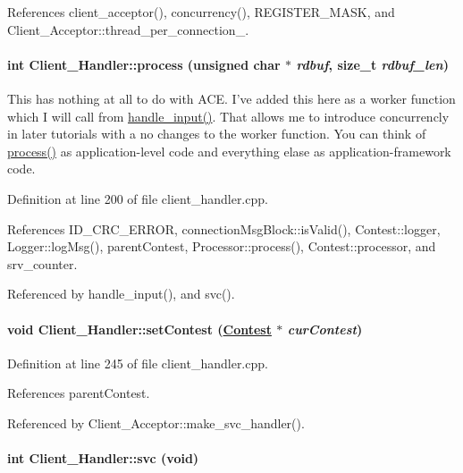 References client\_\-acceptor(), concurrency(), REGISTER\_\-MASK, and Client\_\-Acceptor::thread\_\-per\_\-connection\_\-.\hypertarget{classClient__Handler_Client__Handlerb1}{
\paragraph[process]{\setlength{\rightskip}{0pt plus 5cm}int Client\_\-Handler::process (unsigned char $\ast$ {\em rdbuf}, size\_\-t {\em rdbuf\_\-len})}\hfill}
\label{classClient__Handler_Client__Handlerb1}


This has nothing at all to do with ACE. I've added this here as a worker function which I will call from \hyperlink{classClient__Handler_Client__Handlera5}{handle\_\-input()}. That allows me to introduce concurrencly in later tutorials with a no changes to the worker function. You can think of \hyperlink{classClient__Handler_Client__Handlerb1}{process()} as application-level code and everything elase as application-framework code. 

Definition at line 200 of file client\_\-handler.cpp.

References ID\_\-CRC\_\-ERROR, connection\-Msg\-Block::is\-Valid(), Contest::logger, Logger::log\-Msg(), parent\-Contest, Processor::process(), Contest::processor, and srv\_\-counter.

Referenced by handle\_\-input(), and svc().\hypertarget{classClient__Handler_Client__Handlera6}{
\paragraph[setContest]{\setlength{\rightskip}{0pt plus 5cm}void Client\_\-Handler::set\-Contest (\hyperlink{classContest}{Contest} $\ast$ {\em cur\-Contest})}\hfill}
\label{classClient__Handler_Client__Handlera6}




Definition at line 245 of file client\_\-handler.cpp.

References parent\-Contest.

Referenced by Client\_\-Acceptor::make\_\-svc\_\-handler().\hypertarget{classClient__Handler_Client__Handlerb0}{
\paragraph[svc]{\setlength{\rightskip}{0pt plus 5cm}int Client\_\-Handler::svc (void)}\hfill}
\label{classClient__Handler_Client__Handlerb0}


